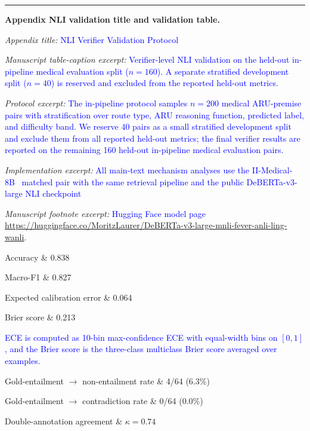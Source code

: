 \documentclass[12pt]{article}
\newcommand{\added}[1]{\textcolor{blue}{#1}}
\newcommand{\responseheading}[1]{%
    \vspace{0.24cm}
    \par\noindent{\large\bfseries #1}\par
    \vspace{0.03cm}
    \noindent\rule{\linewidth}{0.35pt}\par
    \vspace{0.06cm}
    \noindent\ignorespaces
}
\begin{document}
\responseheading{Revision Details}
\textbf{Appendix NLI validation title and validation table.}
\begin{displayquote}
\textit{Appendix title:} \added{NLI Verifier Validation Protocol}

\textit{Manuscript table-caption excerpt:} \added{Verifier-level NLI validation on the held-out in-pipeline medical evaluation split ($n=160$). A separate stratified development split ($n=40$) is reserved and excluded from the reported held-out metrics.}

\textit{Protocol excerpt:} \added{The in-pipeline protocol samples $n=200$ medical ARU-premise pairs with stratification over route type, ARU reasoning function, predicted label, and difficulty band. We reserve 40 pairs as a small stratified development split and exclude them from all reported held-out metrics; the final verifier results are reported on the remaining 160 held-out in-pipeline medical evaluation pairs.}

{\raggedright
\textit{Implementation excerpt:} \added{All main-text mechanism analyses use the II-Medical-8B~\cite{intelligentinternet2025iimedical8b} matched pair with the same retrieval pipeline and the public DeBERTa-v3-large NLI checkpoint}
\par}

\textit{Manuscript footnote excerpt:} \added{Hugging Face model page \url{https://huggingface.co/MoritzLaurer/DeBERTa-v3-large-mnli-fever-anli-ling-wanli}.}

{\color{blue}Accuracy \& 0.838}

{\color{blue}Macro-F1 \& 0.827}

{\color{blue}Expected calibration error \& 0.064}

{\color{blue}Brier score \& 0.213}

\added{ECE is computed as 10-bin max-confidence ECE with equal-width bins on $[0,1]$, and the Brier score is the three-class multiclass Brier score averaged over examples.}

{\color{blue}Gold-entailment $\rightarrow$ non-entailment rate \& 4/64 (6.3\%)}

{\color{blue}Gold-entailment $\rightarrow$ contradiction rate \& 0/64 (0.0\%)}

{\color{blue}Double-annotation agreement \& $\kappa=0.74$}
\end{displayquote}
\end{document}
